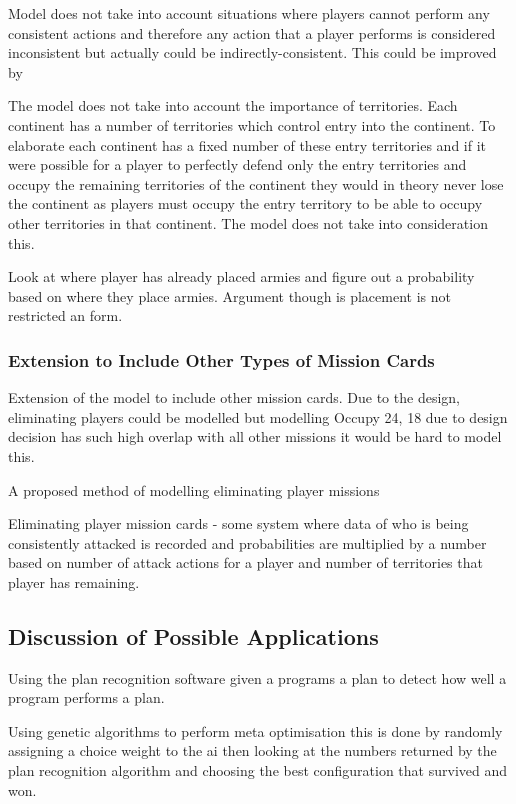 \documentclass[parskip]{cs4rep}
\begin{document}
Model does not take into account situations where players cannot perform any consistent actions and therefore any action that a player performs is considered inconsistent but actually could be indirectly-consistent. This could be improved by

The model does not take into account the importance of territories. Each continent has a number of territories which control entry into the continent. To elaborate each continent has a fixed number of these entry territories and if it were possible for a player to perfectly defend only the entry territories and occupy the remaining territories of the continent they would in theory never lose the continent as players must occupy the entry territory to be able to occupy other territories in that continent. The model does not take into consideration this.

Look at where player has already placed armies and figure out a probability based on where they place armies. Argument though is placement is not restricted an form.

\subsubsection{Extension to Include Other Types of Mission Cards}

Extension of the model to include other mission cards. Due to the design, eliminating players could be modelled but modelling Occupy 24, 18 due to design decision has such high overlap with all other missions it would be hard to model this.

A proposed method of modelling eliminating player missions

Eliminating player mission cards - some system where data of who is being consistently attacked is recorded and probabilities are multiplied by a number based on number of attack actions for a player and number of territories that player has remaining.

\subsection{Discussion of Possible Applications}

Using the plan recognition software given a programs a plan to detect how well a program performs a plan. 

Using genetic algorithms to perform meta optimisation this is done by randomly assigning a choice weight to the ai then looking at the numbers returned by the plan recognition algorithm and choosing the best configuration that survived and won.
\end{document}
